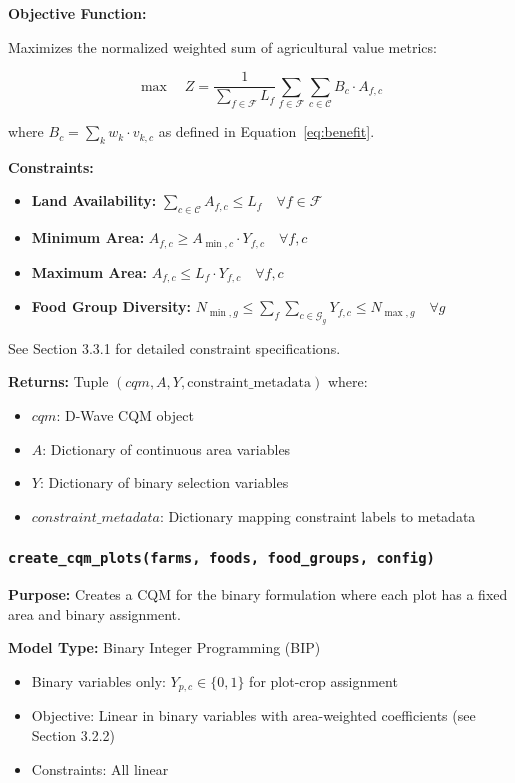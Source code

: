 \documentclass{article}
\begin{document}
\textbf{Objective Function:}

Maximizes the normalized weighted sum of agricultural value metrics:

$$\max \quad Z = \frac{1}{\sum_{f \in \mathcal{F}} L_f} \sum_{f \in \mathcal{F}} \sum_{c \in \mathcal{C}} B_c \cdot A_{f,c}$$

where $B_c = \sum_{k} w_k \cdot v_{k,c}$ as defined in Equation~\ref{eq:benefit}.

\textbf{Constraints:}

\begin{itemize}
    \item \textbf{Land Availability:} $\sum_{c \in \mathcal{C}} A_{f,c} \leq L_f \quad \forall f \in \mathcal{F}$
    \item \textbf{Minimum Area:} $A_{f,c} \geq A_{\min,c} \cdot Y_{f,c} \quad \forall f,c$
    \item \textbf{Maximum Area:} $A_{f,c} \leq L_f \cdot Y_{f,c} \quad \forall f,c$
    \item \textbf{Food Group Diversity:} $N_{\min,g} \leq \sum_{f}\sum_{c \in \mathcal{G}_g} Y_{f,c} \leq N_{\max,g} \quad \forall g$
\end{itemize}

See Section 3.3.1 for detailed constraint specifications.

\textbf{Returns:} Tuple $(cqm, A, Y, \text{constraint\_metadata})$ where:
\begin{itemize}
    \item $cqm$: D-Wave CQM object
    \item $A$: Dictionary of continuous area variables
    \item $Y$: Dictionary of binary selection variables
    \item $constraint\_metadata$: Dictionary mapping constraint labels to metadata
\end{itemize}

\subsubsection{\texttt{create\_cqm\_plots(farms, foods, food\_groups, config)}}

\textbf{Purpose:} Creates a CQM for the binary formulation where each plot has a fixed area and binary assignment.

\textbf{Model Type:} Binary Integer Programming (BIP)
\begin{itemize}
    \item Binary variables only: $Y_{p,c} \in \{0,1\}$ for plot-crop assignment
    \item Objective: Linear in binary variables with area-weighted coefficients (see Section 3.2.2)
    \item Constraints: All linear
\end{itemize}
\end{document}
